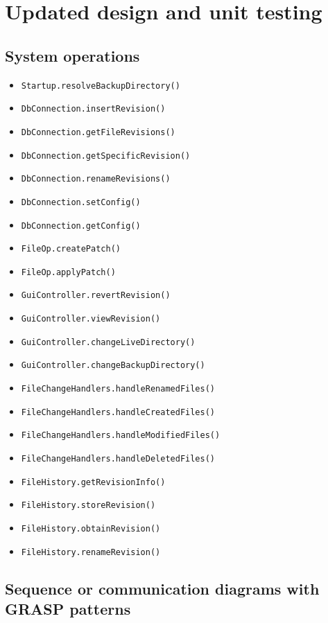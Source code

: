 \documentclass[12pt,a4paper]{article}
\begin{document}
\section{Updated design and unit testing}

\subsection{System operations}
\begin{itemize}
\item \texttt{Startup.resolveBackupDirectory()}
\item \texttt{DbConnection.insertRevision()}
\item \texttt{DbConnection.getFileRevisions()}
\item \texttt{DbConnection.getSpecificRevision()}
\item \texttt{DbConnection.renameRevisions()}
\item \texttt{DbConnection.setConfig()}
\item \texttt{DbConnection.getConfig()}
\item \texttt{FileOp.createPatch()}
\item \texttt{FileOp.applyPatch()}
\item \texttt{GuiController.revertRevision()}
\item \texttt{GuiController.viewRevision()}
\item \texttt{GuiController.changeLiveDirectory()}
\item \texttt{GuiController.changeBackupDirectory()}
\item \texttt{FileChangeHandlers.handleRenamedFiles()}
\item \texttt{FileChangeHandlers.handleCreatedFiles()}
\item \texttt{FileChangeHandlers.handleModifiedFiles()}
\item \texttt{FileChangeHandlers.handleDeletedFiles()}
\item \texttt{FileHistory.getRevisionInfo()}
\item \texttt{FileHistory.storeRevision()}
\item \texttt{FileHistory.obtainRevision()}
\item \texttt{FileHistory.renameRevision()}
\end{itemize}

\subsection{Sequence or communication diagrams with GRASP patterns}
\end{document}
